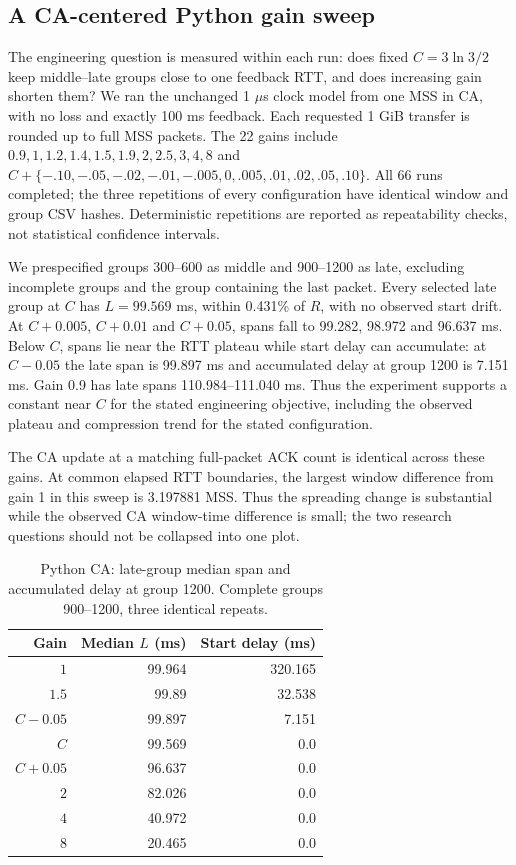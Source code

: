 \documentclass[sigconf,nonacm]{acmart}
\begin{document}
\subsection{A CA-centered Python gain sweep}
The engineering question is measured within each run: does fixed
$C=3\ln3/2$ keep middle--late groups close to one feedback RTT, and does
increasing gain shorten them? We ran the unchanged 1 $\mu$s clock model
from one MSS in CA, with no loss and exactly 100 ms feedback. Each
requested 1 GiB transfer is rounded up to full MSS packets. The 22 gains
include $0.9,1,1.2,1.4,1.5,1.9,2,2.5,3,4,8$ and
$C+\{-.10,-.05,-.02,-.01,-.005,0,.005,.01,.02,.05,.10\}$.
All 66 runs completed; the three repetitions of every configuration have
identical window and group CSV hashes. Deterministic repetitions are
reported as repeatability checks, not statistical confidence intervals.

We prespecified groups 300--600 as middle and 900--1200 as late, excluding
incomplete groups and the group containing the last packet. Every selected
late group at $C$ has $L=99.569$ ms, within 0.431\% of $R$, with no observed
start drift. At $C+0.005$, $C+0.01$ and $C+0.05$, spans fall to 99.282,
98.972 and 96.637 ms. Below $C$, spans lie near the RTT plateau while
start delay can accumulate: at $C-0.05$ the late span is 99.897 ms and
accumulated delay at group 1200 is 7.151 ms. Gain 0.9 has late spans
110.984--111.040 ms. Thus the experiment supports a constant near $C$
for the stated engineering objective, including the observed plateau
and compression trend for the stated configuration.

The CA update at a matching full-packet ACK count is identical across
these gains. At common elapsed RTT boundaries, the largest window
difference from gain 1 in this sweep is 3.197881 MSS. Thus the spreading
change is substantial while the observed CA window-time difference is
small; the two research questions should not be collapsed into one plot.

\begin{table}[t]\small\centering
\caption{Python CA: late-group median span and accumulated delay at group
1200. Complete groups 900--1200, three identical repeats.}\label{tab:caengineering}
\begin{tabular}{@{}rrr@{}}\toprule
Gain & Median $L$ (ms) & Start delay (ms) \\\midrule
$1$ & 99.964 & 320.165 \\
$1.5$ & 99.89 & 32.538 \\
$C-0.05$ & 99.897 & 7.151 \\
$C$ & 99.569 & 0.0 \\
$C+0.05$ & 96.637 & 0.0 \\
$2$ & 82.026 & 0.0 \\
$4$ & 40.972 & 0.0 \\
$8$ & 20.465 & 0.0 \\
\bottomrule
\end{tabular}\end{table}
\end{document}
